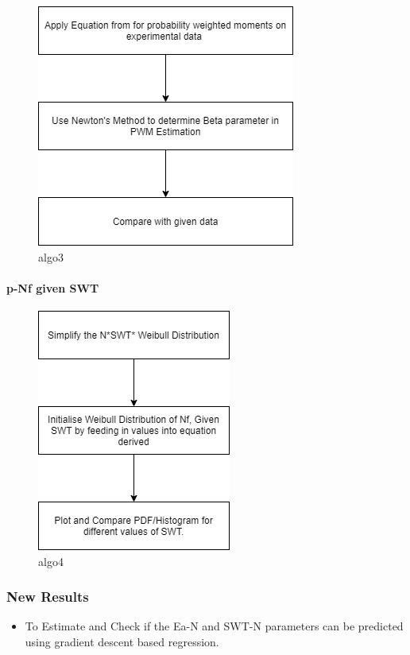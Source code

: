 \documentclass[11pt]{article}
\providecommand{\tightlist}{%
      \setlength{\itemsep}{0pt}\setlength{\parskip}{0pt}}
\begin{document}
\begin{center}
\begin{figure}
\centering
\includegraphics[scale=0.69]{images/algo3.png}
\caption{algo3}
\end{figure}

\hypertarget{p-nf-given-swt}{%
\paragraph{p-Nf given SWT}\label{p-nf-given-swt}}

\begin{figure}
\centering
\includegraphics[scale=0.69]{images/algo4.png}
\caption{algo4}
\end{figure}
\end{center}
\hypertarget{new-results}{%
\subsubsection{New Results}\label{new-results}}

\begin{itemize}
\tightlist
\item
  To Estimate and Check if the Ea-N and SWT-N parameters can be
  predicted using gradient descent based regression.
\end{itemize}
\end{document}
